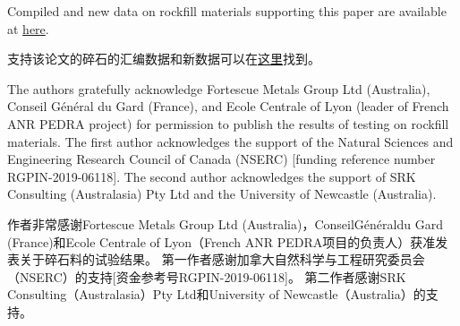\begin{ParaColumn}

    Compiled and new data on rockfill materials supporting this paper are available at \href{https://doi.org/10.5281/zenodo.3625778}{here}.

    \switchcolumn

    支持该论文的碎石的汇编数据和新数据可以在\href{https://doi.org/10.5281/zenodo.3625778}{这里}找到。


    The authors gratefully acknowledge Fortescue Metals Group Ltd (Australia), Conseil Général du Gard (France), and Ecole Centrale of Lyon (leader of French ANR PEDRA project) for permission to publish the results of testing on rockfill materials. The first author acknowledges the support of the Natural Sciences and Engineering Research Council of Canada (NSERC) [funding reference number RGPIN-2019-06118]. The second author acknowledges the support of SRK Consulting (Australasia) Pty Ltd and the University of Newcastle (Australia).

    \switchcolumn

    作者非常感谢Fortescue Metals Group Ltd (Australia)，ConseilGénéraldu Gard (France)和Ecole Centrale of Lyon（French ANR PEDRA项目的负责人）获准发表关于碎石料的试验结果。 第一作者感谢加拿大自然科学与工程研究委员会（NSERC）的支持[资金参考号RGPIN-2019-06118]。 第二作者感谢SRK Consulting（Australasia）Pty Ltd和University of Newcastle（Australia）的支持。

\end{ParaColumn}